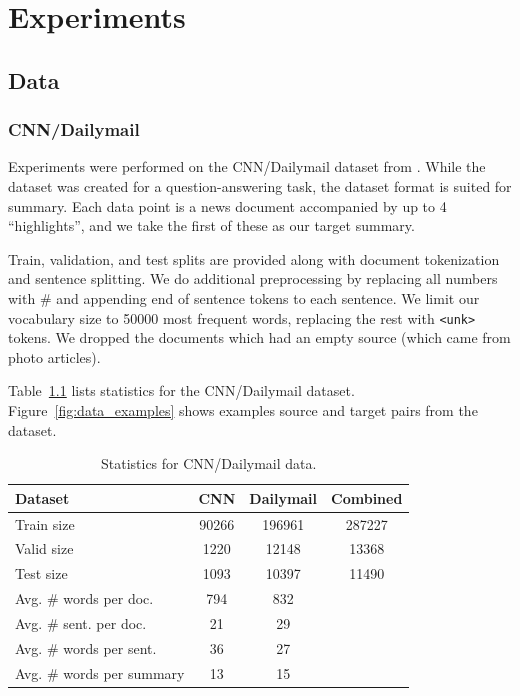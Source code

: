 \documentclass[12pt]{report}
\begin{document}
%


\chapter{Experiments}
\label{chap:experiments}

\section{Data}

\subsection{CNN/Dailymail}

Experiments were performed on the CNN/Dailymail dataset from \cite{Hermann2015}.
While the dataset was created for a question-answering task, the dataset format is suited for summary. Each data point is a news document accompanied by up to 4 ``highlights'', and we take the first of these as our target summary.



Train, validation, and test splits are provided along with document tokenization and sentence splitting. We do additional preprocessing by replacing all numbers with \# and appending end of sentence tokens to each sentence. We limit our vocabulary size to 50000 most frequent words, replacing the rest with \texttt{<unk>} tokens. We dropped the documents which had an empty source (which came from photo articles).

 Table~\ref{table:data_stats} lists statistics for the CNN/Dailymail dataset. Figure~\ref{fig:data_examples} shows examples source and target pairs from the dataset.



\begin{table}[h]
\centering
\begin{tabular}{lccc}
\toprule
Dataset  & CNN & Dailymail & Combined\\
\midrule
Train size & 90266 & 196961 & 287227\\
Valid size & 1220 & 12148 & 13368\\
Test size & 1093 & 10397 & 11490 \\
Avg. \# words per doc. & 794 & 832\\
Avg. \# sent. per doc. & 21 & 29\\
Avg. \# words per sent. & 36 & 27\\
Avg. \# words per summary & 13 & 15 \\
\bottomrule
\end{tabular}
\caption{Statistics for CNN/Dailymail data.}
\label{table:data_stats}
\end{table}
\end{document}
